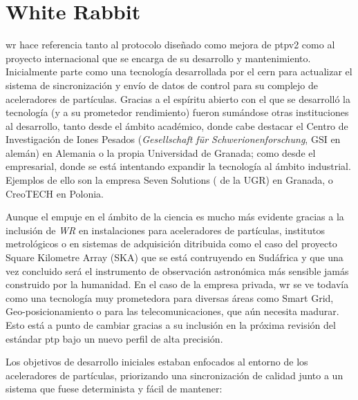 \section{White Rabbit} \label{sec:wr}

\acrfull{wr} hace referencia tanto al protocolo diseñado como mejora de 
\gls{ptp}v2 como al proyecto internacional que se encarga de su desarrollo y 
mantenimiento. Inicialmente parte como una tecnología desarrollada por el 
\gls{cern} para actualizar el sistema de sincronización y envío de datos de 
control para su complejo de aceleradores de partículas. Gracias a el espíritu 
abierto con el que se desarrolló la tecnología (y a su prometedor rendimiento) 
fueron sumándose otras instituciones al desarrollo, tanto desde el ámbito 
académico, donde cabe destacar el Centro de Investigación de Iones Pesados 
(\textit{Gesellschaft für Schwerionenforschung}, GSI en alemán) en Alemania o 
la propia Universidad de Granada; como desde el empresarial, donde se está 
intentando expandir la tecnología al ámbito industrial. Ejemplos de ello son la 
empresa Seven Solutions ( de la UGR) en Granada, o CreoTECH en 
Polonia. 

Aunque el empuje en el ámbito de la ciencia es mucho más 
evidente gracias a la inclusión de \textit{WR} en instalaciones para 
aceleradores de partículas, institutos metrológicos o en sistemas de 
adquisición ditribuida como el caso del proyecto Square Kilometre Array (SKA) 
que se está contruyendo en Sudáfrica y que una vez concluido será el 
instrumento de observación astronómica más sensible jamás construido por la 
humanidad. En el caso de la empresa privada, \gls{wr} se ve todavía como una 
tecnología muy prometedora para diversas áreas como Smart Grid, 
Geo-posicionamiento o para las telecomunicaciones, que aún necesita madurar. 
Esto está a punto de cambiar gracias a su inclusión en la próxima revisión del 
estándar \gls{ptp} bajo un nuevo perfil de alta precisión.

Los objetivos de desarrollo iniciales estaban enfocados al entorno de los 
aceleradores de partículas, priorizando una sincronización de calidad junto a 
un sistema que fuese determinista y fácil de mantener:

